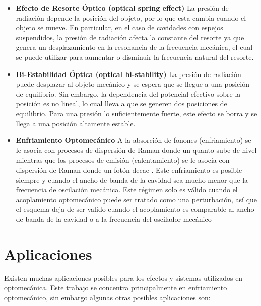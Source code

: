 \documentclass[10pt,a4paper]{report}
\begin{document}
\begin{itemize}
\item \textbf{Efecto de Resorte Óptico (optical spring effect)} La presión de radiación depende la posición del objeto, por lo que esta cambia cuando el objeto se mueve. En particular, en el caso de cavidades con espejos suspendidos, la presión de radiación afecta la constante del resorte ya que genera un desplazamiento en la resonancia de la frecuencia mecánica, el cual se puede utilizar para aumentar o disminuir la frecuencia natural del resorte.\cite{BraginskyPE}

\item \textbf{Bi-Estabilidad Óptica (optical bi-stability)} La presión de radiación puede desplazar al objeto mecánico y se espera que se llegue a una posición de equilibrio. Sin embargo, la dependencia del potencial efectivo sobre la posición es no lineal, lo cual lleva a que se generen dos posiciones de equilibrio. Para una presión lo suficientemente fuerte, este efecto se borra y se llega a una posición altamente estable\cite{DorselOB}.

\item \textbf{Enfriamiento Optomecánico}  A la absorción de fonones (enfriamiento) se le asocia con procesos de dispersión de Raman donde un quanto sube de nivel mientras que los procesos de emisión (calentamiento) se le asocia con dispersión de Raman donde un fotón decae \cite{LCNooshi}. Este enfriamiento es posible siempre y cuando el ancho de banda de la cavidad sea mucho menor que la frecuencia de oscilación mecánica. \cite{LCNooshi} \cite{MarquardtSC} Este régimen solo es válido cuando el acoplamiento optomecánico puede ser tratado como una perturbación, así que el esquema deja de ser valido cuando el acoplamiento es comparable al ancho de banda de la cavidad o a la frecuencia del oscilador mecánico
\end{itemize}


\section{Aplicaciones}

Existen muchas aplicaciones posibles para los efectos y sistemas utilizados en optomecánica. Este trabajo se concentra principalmente en enfriamiento optomecánico, sin embargo algunas otras posibles aplicaciones son:
\end{document}
